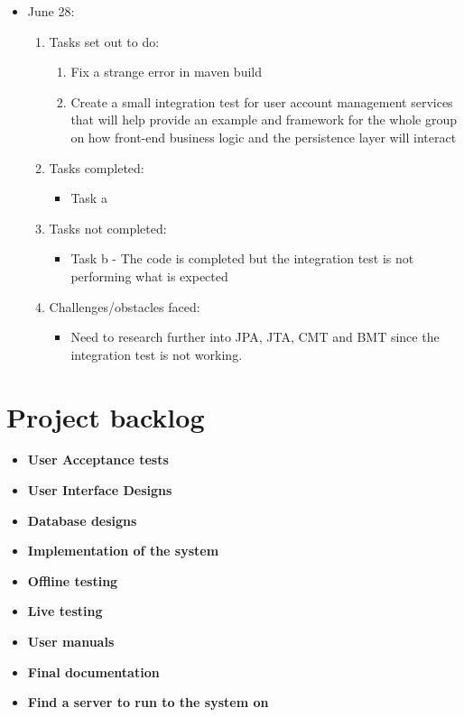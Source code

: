 \documentclass[12pt]{article}
\begin{document}
	\begin{itemize}
		\item June 28:
		\begin{enumerate}
			\item Tasks set out to do:
			\begin{enumerate}
				\item Fix a strange error in maven build
				\item Create a small integration test for user account management services that will help provide an example and framework for the whole group on how front-end business logic and the persistence layer will interact				
			\end{enumerate}
			\item Tasks completed:
			\begin{itemize}
				\item Task a								
			\end{itemize}
			\item Tasks not completed:
			\begin{itemize}
				\item Task b - The code is completed but the integration test is not performing what is expected
			\end{itemize}
			\item Challenges/obstacles faced:
			\begin{itemize}
				\item Need to research further into JPA, JTA, CMT and BMT since the integration test is not working.
			\end{itemize}			
		\end{enumerate}
	\end{itemize}

\section{Project backlog}

\begin{itemize}
\item \textbf{User Acceptance tests}
\item \textbf{User Interface Designs}
\item \textbf{Database designs}
\item \textbf{Implementation of the system}
\item \textbf{Offline testing}
\item \textbf{Live testing}
\item \textbf{User manuals}
\item \textbf{Final documentation}
\item \textbf{Find a server to run to the system on}


\end{itemize}
\end{document}
